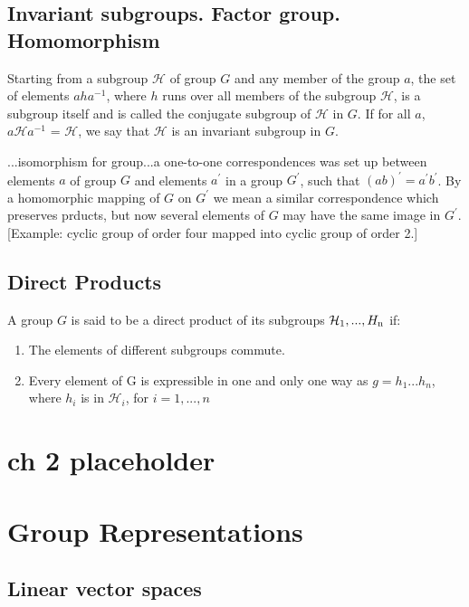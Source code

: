 \documentclass{book}
\begin{document}
\section{Invariant subgroups. Factor group. Homomorphism}

Starting from a subgroup $\mathcal H$ of group $G$ and any member of
the group $a$, the set of elements $aha^{-1}$, where $h$ runs over all
members of the subgroup $\mathcal H$, is a subgroup itself and is
called the conjugate subgroup of $\mathcal H$ in $G$. If for all $a$,
$a{\mathcal H} a^{-1}$ = $\mathcal H$, we say that $\mathcal H$ is an
invariant subgroup in $G$.

...isomorphism for group...a one-to-one correspondences was set up
between elements $a$ of group $G$ and elements $a^\prime$ in a group
$G^\prime$, such that $(ab)^\prime = a^\prime b^\prime$. By a
homomorphic mapping of $G$ on $G^\prime$ we mean a similar
correspondence which preserves prducts, but now several elements of
$G$ may have the same image in $G^\prime$. [Example: cyclic group of
  order four mapped into cyclic group of order 2.]

\section{Direct Products}

A group $G$ is said to be a direct product of its subgroups ${\mathcal H_{\rm 1},...,H_{\rm n}}$ if:

\begin{enumerate}
\item The elements of different subgroups commute.
\item Every element of G is expressible in one and only one way as
  $g = h_1...h_n$, where $h_i$ is in ${\mathcal H}_i$, for $i = 1,...,n$
\end{enumerate}

\chapter{ch 2 placeholder}

\chapter{Group Representations}

\section{Linear vector spaces}
\end{document}
